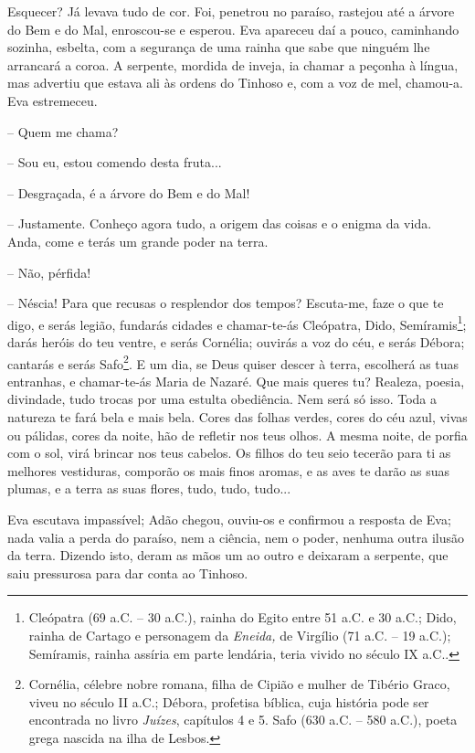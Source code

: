 Esquecer? Já levava tudo de cor. Foi, penetrou no paraíso, rastejou até
a árvore do Bem e do Mal, enroscou-se e esperou. Eva apareceu daí a
pouco, caminhando sozinha, esbelta, com a segurança de uma rainha que
sabe que ninguém lhe arrancará a coroa. A serpente, mordida de inveja,
ia chamar a peçonha à língua, mas advertiu que estava ali às ordens do
Tinhoso e, com a voz de mel, chamou-a. Eva estremeceu.

-- Quem me chama?

-- Sou eu, estou comendo desta fruta...

-- Desgraçada, é a árvore do Bem e do Mal!

-- Justamente. Conheço agora tudo, a origem das coisas e o enigma da
vida. Anda, come e terás um grande poder na terra.

-- Não, pérfida!

-- Néscia! Para que recusas o resplendor dos tempos? Escuta-me, faze o
que te digo, e serás legião, fundarás cidades e chamar-te-ás Cleópatra,
Dido, Semíramis\footnote{Cleópatra (69 a.C. -- 30 a.C.), rainha do Egito
  entre 51 a.C. e 30 a.C.; Dido, rainha de Cartago e personagem da
  \emph{Eneida,} de Virgílio (71 a.C. -- 19 a.C.); Semíramis, rainha
  assíria em parte lendária, teria vivido no século IX a.C..}; darás
heróis do teu ventre, e serás Cornélia; ouvirás a voz do céu, e serás
Débora; cantarás e serás Safo\footnote{Cornélia, célebre nobre romana,
  filha de Cipião e mulher de Tibério Graco, viveu no século II a.C.;
  Débora, profetisa bíblica, cuja história pode ser encontrada no livro
  \emph{Juízes}, capítulos 4 e 5. Safo (630 a.C. -- 580 a.C.), poeta
  grega nascida na ilha de Lesbos.}. E um dia, se Deus quiser descer à
terra, escolherá as tuas entranhas, e chamar-te-ás Maria de Nazaré. Que
mais queres tu? Realeza, poesia, divindade, tudo trocas por uma estulta
obediência. Nem será só isso. Toda a natureza te fará bela e mais bela.
Cores das folhas verdes, cores do céu azul, vivas ou pálidas, cores da
noite, hão de refletir nos teus olhos. A mesma noite, de porfia com o
sol, virá brincar nos teus cabelos. Os filhos do teu seio tecerão para
ti as melhores vestiduras, comporão os mais finos aromas, e as aves te
darão as suas plumas, e a terra as suas flores, tudo, tudo, tudo...

Eva escutava impassível; Adão chegou, ouviu-os e confirmou a resposta de
Eva; nada valia a perda do paraíso, nem a ciência, nem o poder, nenhuma
outra ilusão da terra. Dizendo isto, deram as mãos um ao outro e
deixaram a serpente, que saiu pressurosa para dar conta ao Tinhoso.

